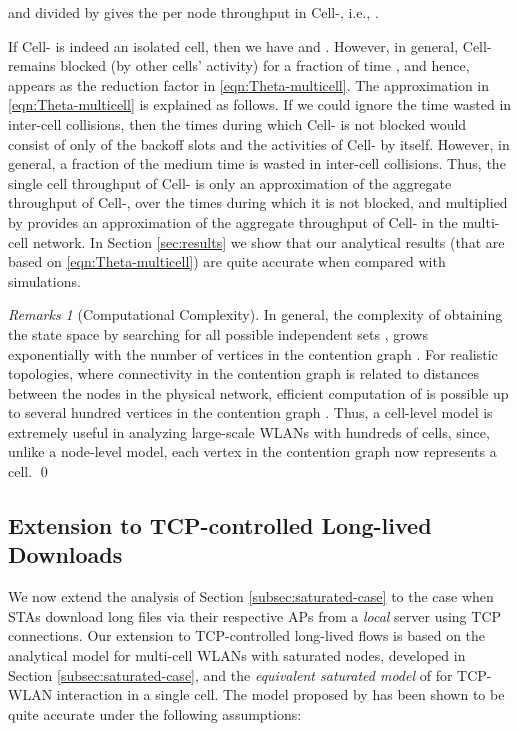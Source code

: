 \documentclass[10pt,a4paper,journal]{IEEEtran}
\theoremstyle{definition}
\theoremstyle{remark}
\newtheorem{remark}{Remarks}[section] \newtheorem{discussion}{Discussion}[section] \newtheorem{example}{Example}[section]
\theoremstyle{plain}
\begin{document}
and  divided by  gives the per node throughput  in Cell-, i.e., . 




If Cell- is indeed an isolated cell, then we have  and . However, in general, Cell- remains blocked (by other cells' activity) for a fraction of time , and hence,  appears as the reduction factor in \eqref{eqn:Theta-multicell}. The approximation in \eqref{eqn:Theta-multicell} is explained as follows. If we could ignore the time wasted in inter-cell collisions, then the times during which Cell- is not blocked would consist of only of the backoff slots and the activities of Cell- by itself. However, in general, a fraction of the medium time is wasted in inter-cell collisions. Thus, the single cell throughput  of Cell- is only an approximation of the aggregate throughput of Cell-, over the times during which it is not blocked, and  multiplied by  provides an approximation of the aggregate throughput  of Cell- in the multi-cell network. In Section \ref{sec:results} we show that our analytical results (that are based on \eqref{eqn:Theta-multicell}) are quite accurate when compared with simulations. 





\begin{remark}[Computational Complexity]
\label{rmk:model-complexity}
In general, the complexity of obtaining the state space  by searching for all possible independent sets , grows exponentially with the number of vertices in the contention graph \cite{wanet.kershenbaum-etal87complex}. For realistic topologies, where connectivity in the contention graph is related to distances between the nodes in the physical network, efficient computation of  is possible up to several hundred vertices in the contention graph \cite{wanet.kershenbaum-etal87complex}. Thus, a cell-level model is extremely useful in analyzing large-scale WLANs with hundreds of cells, since, unlike a node-level model, each vertex in the contention graph now represents a cell. \hfill \qed

\end{remark}



\subsection{Extension to TCP-controlled Long-lived Downloads}
\label{subsec:TCP-traffic}

We now extend the analysis of Section \ref{subsec:saturated-case} to the case when STAs download long files via their respective APs from a \textit{local} server using TCP connections. Our extension to TCP-controlled long-lived flows is based on the analytical model for multi-cell WLANs with saturated nodes, developed in Section \ref{subsec:saturated-case}, and the \textit{equivalent saturated model} of \cite{wanet.bruno08TCPeqvSatModel} for TCP-WLAN interaction in a single cell. The model proposed by \cite{wanet.bruno08TCPeqvSatModel} has been shown to be quite accurate under the following assumptions:
\end{document}
